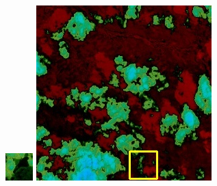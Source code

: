 \documentclass[10pt]{ctexart}
\begin{document}
\begin{figure}[H]
{{\begin{minipage}[b]{0.15\linewidth}
            \includegraphics[width=1\linewidth]{../log/spoon2/cut/tmp_cut_LC80350192014190LGN00_06561_spectral.jpg}\vspace{4pt}
            \includegraphics[width=1\linewidth]{../log/spoon2/cut/LC80980712014024LGN00_15443_spectral.jpg}\vspace{4pt}

\end{minipage}}}
\end{figure}
\end{document}
